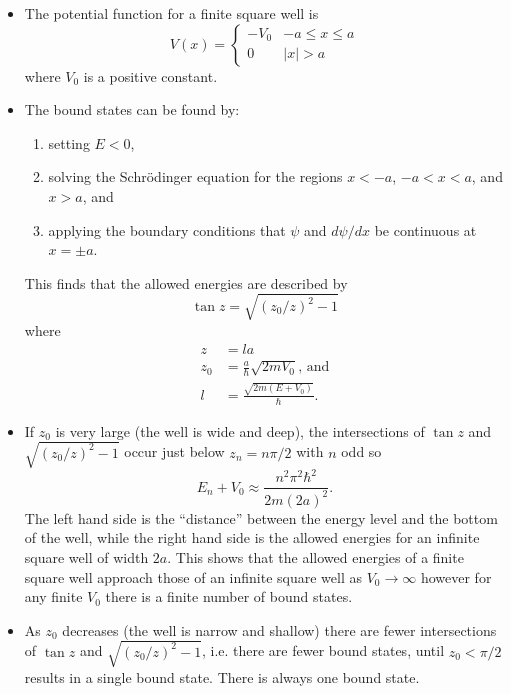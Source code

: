 \documentclass{article}
\begin{document}
\begin{itemize}
  \item The potential function for a finite square well is \[V(x) = \begin{cases}
            -V_0 & -a \le x \le a \\
            0    & |x| > a
          \end{cases}\] where $V_0$ is a positive constant.

  \item The bound states can be found by:

        \begin{enumerate}
          \item setting $E < 0$,

          \item solving the Schrödinger equation for the regions $x < -a$, $-a < x < a$, and $x > a$, and

          \item applying the boundary conditions that $\psi$ and $d \psi / d x$ be continuous at $x = \pm a$.
        \end{enumerate}

        This finds that the allowed energies are described by \[\tan z = \sqrt{(z_0 / z)^2 - 1}\] where \begin{align*}
          z   & = l a                                         \\
          z_0 & = \frac{a}{\hbar} \sqrt{2 m V_0} \text{, and} \\
          l   & = \frac{\sqrt{2 m (E + V_0)}}{\hbar}.
        \end{align*}

  \item If $z_0$ is very large (the well is wide and deep), the intersections of $\tan z$ and $\sqrt{(z_0 / z)^2 - 1}$ occur just below $z_n = n \pi / 2$ with $n$ odd so \[E_n + V_0 \approx \frac{n^2 \pi^2 \hbar^2}{2 m (2 a)^2}.\] The left hand side is the ``distance'' between the energy level and the bottom of the well, while the right hand side is the allowed energies for an infinite square well of width $2 a$. This shows that the allowed energies of a finite square well approach those of an infinite square well as $V_0 \rightarrow \infty$ however for any finite $V_0$ there is a finite number of bound states.

  \item As $z_0$ decreases (the well is narrow and shallow) there are fewer intersections of $\tan z$ and $\sqrt{(z_0 / z)^2 - 1}$, i.e. there are fewer bound states, until $z_0 < \pi / 2$ results in a single bound state. There is always one bound state.


\end{itemize}
\end{document}
